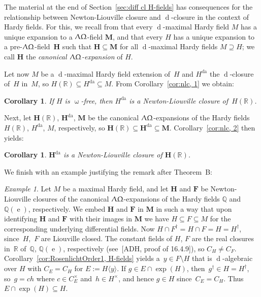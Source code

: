 \documentclass[]{amsart}
\numberwithin{equation}{section}
\newcommand{\bbold}{\mathbb}
\def\R { {\bbold R} }
\def\Q { {\bbold Q} }
\def \ex{\operatorname{e}}
\def \d{\operatorname{d}}
\newtheorem{cor}[theorem]{Corollary}
\theoremstyle{definition}
\theoremstyle{remark}
\newtheorem*{example}{Example}
\def \Upl{\Uplambda}
\def \upo{\upomega}
\def \Upo{\Upomega}
\def\HLO{\Upl\Upo}
\begin{document}
\medskip
\noindent
The material at the end of Section~\ref{sec:diff cl H-fields} has consequences
for the relationship between Newton-Liouville closure and $\d$-closure  in the context of Hardy fields.
For this, we recall from \cite[Section~12]{ADH2}  that every $\d$-maximal Hardy field $M$ has a unique expansion
to a $\HLO$-field $\boldsymbol M$, and that every $H$ has a unique expansion to a pre-$\HLO$-field~$\boldsymbol H$ such that $\boldsymbol H\subseteq\boldsymbol M$ for all $\d$-maximal Hardy fields $M\supseteq H$; we call
$\boldsymbol H$ the {\it canonical $\HLO$-expansion}\/ of $H$.

Let now $M$ be a $\d$-maximal Hardy field extension of~$H$ and 
$H^{\operatorname{da}}$ the $\d$-closure of~$H$ in~$M$, so $H(\R)\subseteq H^{\operatorname{da}}\subseteq M$. 
From Corollary~\ref{cor:nlc, 1} we  obtain: 

\begin{cor}
If $H$ is $\upo$-free, then $H^{\operatorname{da}}$ is a Newton-Liouville closure of~$H(\R)$.
\end{cor}

\noindent
Next, let $\boldsymbol H(\R)$, $\boldsymbol H^{\operatorname{da}}$, $\boldsymbol M$ be the canonical $\HLO$-expansions of the Hardy fields $H(\R)$, $H^{\operatorname{da}}$, $M$, respectively,
so $\boldsymbol H(\R)\subseteq\boldsymbol H^{\operatorname{da}}\subseteq\boldsymbol M$.      Corollary~\ref{cor:nlc, 2} then yields:

\begin{cor}
$\boldsymbol H^{\operatorname{da}}$ is a Newton-Liouville closure of $\boldsymbol H(\R)$.
\end{cor}

\noindent
We finish with an example   justifying the remark after Theorem~B:

\begin{example}
Let $M$ be a maximal Hardy field, and let 
$\mathbf H$ and
$\mathbf F$ be Newton-Liouville closures  of the canonical $\HLO$-expansions of the Hardy fields $\Q$ and $\Q(\ex)$, respectively. We embed  $\mathbf H$ and $\mathbf F$ in $\mathbf M$ in such a way that upon identifying
$\mathbf H$ and $\mathbf F$ with their images in $\mathbf M$ we have
 $H\subseteq F\subseteq M$ for the corresponding underlying differential fields. Now $H\cap F^\dagger=H\cap F= H=H^\dagger$, since~$H$,~$F$ are Liouville closed.
The constant fields of $H$, $F$ are the real closures in~$\R$ of~$\Q$, $\Q(\ex)$, respectively (see~[ADH, proof of  16.4.9]), so $C_H\neq C_F$.  
Corollary~\ref{cor:RosenlichtOrder1, H-fields} yields a~$y\in F\setminus H$ that is $\d$-algebraic over $H$ with
$C_{E}=C_H$ for $E:=H\langle y\rangle$. If $g\in E\cap\exp(H)$,  then~${g^\dagger\in H=H^\dagger}$, so~$g=ch$ where $c\in C_E^\times$ and~$h\in H^\times$,
and hence $g\in H$ since~$C_E=C_H$.
Thus~${E\cap \exp(H) \subseteq H}$.   
\end{example}
\end{document}
